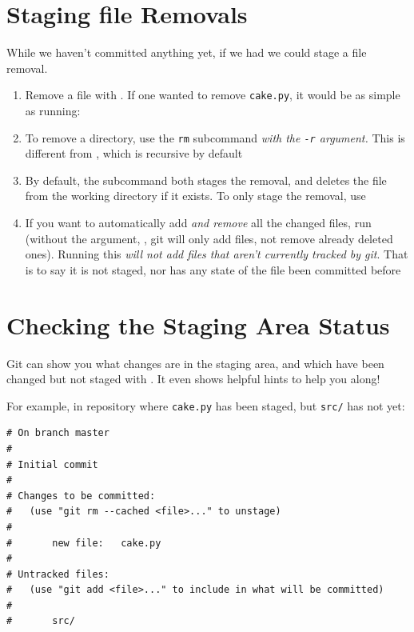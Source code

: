 \documentclass[11pt,letterpaper,twoside]{report}
\begin{document}
\section{Staging file Removals}

While we haven't committed anything yet, if we had we could stage a file
removal.

\begin{enumerate}
\item Remove a file with . If one wanted to remove
    \texttt{cake.py}, it would be as simple as running:
    
\item To remove a directory, use the \texttt{rm} subcommand \emph{with the
    \texttt{-r} argument.} This is different from , which is
    recursive by default
\item By default, the subcommand both stages the removal, and deletes the file
    from the working directory if it exists. To only stage the removal, use
\item If you want to automatically add \emph{and remove} all the changed files,
    run  (without the  argument,
    , git will only add files, not remove already deleted ones).
    Running this \emph{will not add files that aren't currently tracked by git}.
    That is to say it is not staged, nor has any state of the file been
    committed before
\end{enumerate}

\section{Checking the Staging Area Status}

Git can show you what changes are in the staging area, and which have been
changed but not staged with . It even shows helpful hints to
help you along!

For example, in repository where \texttt{cake.py} has been staged, but
\texttt{src/} has not yet:

\begin{lstlisting}[numbers=none]
# On branch master
#
# Initial commit
#
# Changes to be committed:
#   (use "git rm --cached <file>..." to unstage)
#
#       new file:   cake.py
#
# Untracked files:
#   (use "git add <file>..." to include in what will be committed)
#
#       src/
\end{lstlisting}
\end{document}
